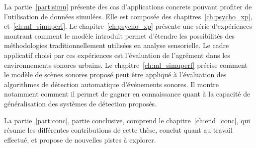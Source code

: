 La partie~\ref{part:simu} présente des cas d'applications concrets pouvant profiter de l'utilisation de données simulées. Elle est composée des chapitres~\ref{ch:psycho_xp}, et~\ref{ch:ml_simuperf}. Le chapitre~\ref{ch:psycho_xp} présente une série d'expériences montrant comment le modèle introduit permet d'étendre les possibilités des méthodologies traditionnellement utilisées en analyse sensorielle. Le cadre applicatif choisi par ces expériences est l'évaluation de l'agrément dans les environnements sonores urbains. Le chapitre~\ref{ch:ml_simuperf} précise comment le modèle de scènes sonores proposé peut être appliqué à l'évaluation des algorithmes de détection automatique d'événements sonores. Il montre notamment comment il permet de gagner en connaissance quant à la capacité de généralisation des systèmes de détection proposés.

La partie~\ref{part:conc}, partie conclusive, comprend le chapitre~\ref{ch:end_conc}, qui résume les différentes contributions de cette thèse, conclut quant au travail effectué, et propose de nouvelles pistes à explorer.






